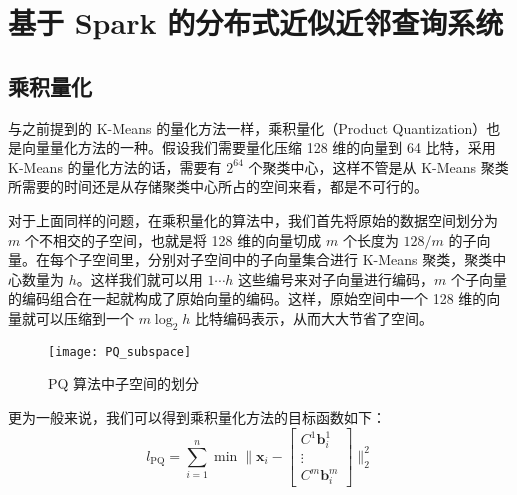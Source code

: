 

\chapter{基于 Spark 的分布式近似近邻查询系统}
\label{cha:ANNS_based_on_Spark}
\section{乘积量化}
\label{sec:product_quantization}
与之前提到的 K-Means 的量化方法一样，乘积量化（Product Quantization）\cite{Herve_PQ}也是向量量化方法的一种。假设我们需要量化压缩 128 维的向量到 64 比特，采用 K-Means 的量化方法的话，需要有 $2^{64}$ 个聚类中心，这样不管是从 K-Means 聚类所需要的时间还是从存储聚类中心所占的空间来看，都是不可行的。

对于上面同样的问题，在乘积量化的算法中，我们首先将原始的数据空间划分为 $m$ 个不相交的子空间，也就是将 128 维的向量切成 $m$ 个长度为 $128/m$ 的子向量。在每个子空间里，分别对子空间中的子向量集合进行 K-Means 聚类，聚类中心数量为 $h$。这样我们就可以用 $1\cdots h$ 这些编号来对子向量进行编码，$m$ 个子向量的编码组合在一起就构成了原始向量的编码。这样，原始空间中一个 128 维的向量就可以压缩到一个 $m\log_2h$ 比特编码表示，从而大大节省了空间。
\begin{figure}[H]
  \centering
  \texttt{[image: PQ\_subspace]}
  \caption{PQ 算法中子空间的划分}
  \label{fig:PQ_subspace}
\end{figure}
更为一般来说，我们可以得到乘积量化方法的目标函数如下：
\begin{equation}
\mathit{l}_\mathrm{PQ} = \sum_{i=1}^n\min\Bigg\lVert \mathbf{x}_i - \begin{bmatrix}C^1\mathbf{b}^1_i\\\vdots\\C^m\mathbf{b}^m_i\end{bmatrix} \Bigg\rVert _2^2
\end{equation}

